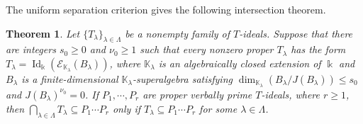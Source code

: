 \documentclass[11pt,reqno]{amsart}
\newcommand{\kk}{\Bbbk}
\newcommand{\KK}{\mathbb{K}}
\newcommand{\E}{\mathcal E}
\newcommand{\Id}{\operatorname{Id}}
\newtheorem{theorem}{Theorem}[section]
\theoremstyle{definition}
\theoremstyle{remark}
\numberwithin{equation}{section}
\begin{document}
The uniform separation criterion gives the following
intersection theorem.

\begin{theorem}\label{thm:bounded-intersection}
Let $\{T_\lambda\}_{\lambda\in\Lambda}$ be a nonempty
family of $T$-ideals. Suppose that there are integers
$s_0\geq0$ and $\nu_0\geq1$ such that every nonzero
proper $T_\lambda$ has the form
$T_\lambda=\Id_{\kk}(\E_{\KK_\lambda}(B_\lambda))$,
where $\KK_\lambda$ is an algebraically closed extension
of $\kk$ and $B_\lambda$ is a finite-dimensional
$\KK_\lambda$-superalgebra satisfying
$\dim_{\KK_\lambda}(B_\lambda/J(B_\lambda))\leq s_0$
and $J(B_\lambda)^{\nu_0}=0$.
If $P_1,\cdots,P_r$ are proper verbally prime
$T$-ideals, where $r\geq1$, then
$\bigcap_{\lambda\in\Lambda}T_\lambda
\subseteq P_1\cdots P_r$ only if
$T_\lambda\subseteq P_1\cdots P_r$
for some $\lambda\in\Lambda$.
\end{theorem}
\end{document}
